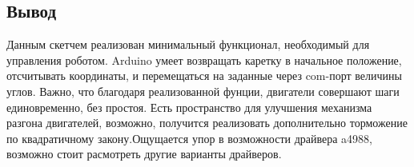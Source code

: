 \subsection{Вывод}

Данным скетчем реализован минимальный функционал, необходимый для управления роботом. Arduino умеет возвращать каретку в начальное положение, отсчитывать координаты, и перемещаться на заданные через com-порт величины углов. Важно, что благодаря реализованной фунции, двигатели совершают шаги единовременно, без простоя. Есть пространство для улучшения механизма разгона двигателей, возможно, получится реализовать дополнительно торможение по квадратичному закону.Ощущается упор в возможности драйвера a4988, возможно стоит расмотреть другие варианты драйверов.  

